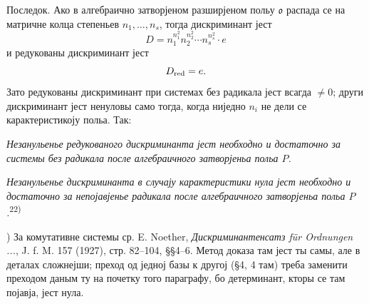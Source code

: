 ﻿\documentclass[11pt]{article}
\providecommand{\mo}{\mathfrak{o}}
\begin{document}
Последок. Ако в алгебраично затворјеном разширјеном польу $\mo$ распада се на матричне колца степеньев $n_1,\ldots,n_s$, тогда дискриминант јест
\[
        D=n_1^{n_1^2}n_2^{n_2^2}\cdots n_s^{n_s^2}\cdot e
\]
и редукованы дискриминант јест
\[
        D_{\rm red}=e.
\]
Зато редукованы дискриминант при системах без радикала јест всагда $\ne0$; други дискриминант јест ненуловы само тогда, когда ниједно $n_i$ не дели се карактеристикоју польа. Так:

\emph{Незанульенье редукованого дискриминанта јест необходно и достаточно за системы без радикала после алгебраичного затворјеньа польа $P$.}

\emph{Незанульенье дискриминанта в случају карактеристики нула јест необходно и достаточно за непојавјенье радикала после алгебраичного затворјеньа польа $P$.}\textsuperscript{22)}

{\footnotesize{}) За комутативне системы ср. E. Noether, \emph{Дискриминантенсатз für Ordnungen ...}, J. f. M. 157 (1927), стр. 82--104, §§4--6. Метод доказа там јест ты самы, але в деталах сложнејши; преход од једној базы к другој (§4, 4 там) треба заменити преходом даным ту на почетку того параграфу, бо детерминант, кторы се там појавја, јест нула.\par}
\end{document}
